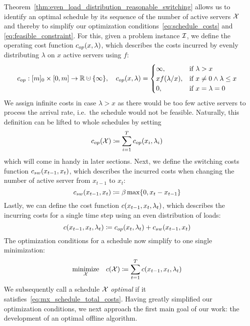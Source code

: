 Theorem~\ref{thm:even_load_distribution_reasonable_switching} allows us to identify an optimal schedule by its sequence of the number of active servers $\mathcal{X}$ and thereby to simplify our optimization conditions~\eqref{eq:schedule_costs} and \eqref{eq:feasible_constraint}. 
For this, given a problem instance $\mathcal{I}$, we define the operating cost function $c_{op}(x,\lambda)$, which describes the costs incurred by evenly distributing $\lambda$ on $x$ active servers using $f$:
\begin{equation}\label{eq:mx_schedule_op_costs}
	\opcosts:[m]_0\times[0,m]\rightarrow\mathbb{R}\dotcup\{\infty\},\quad \opcosts(x,\lambda)=\begin{cases}
	  \infty, & \text{if $\lambda>x$}\\
	  xf(\lambda/x), & \text{if $x\ne 0\land\lambda\le x$}\\
          0, & \text{if $x=\lambda=0$}
	  \end{cases}
\end{equation}
We assign infinite costs in case $\lambda>x$ as there would be too few active servers to process the arrival rate, i.e.\ the schedule would not be feasible. Naturally, this definition can be lifted to whole schedules by setting
\begin{equation}\label{eq:mx_schedule_op_costs_complete}
	c_{op}(\mathcal{X})\coloneqq\sum\limits_{i=1}^Tc_{op}(x_i,\lambda_i)
\end{equation}
which will come in handy in later sections. Next, we define the switching costs function $c_{sw}(x_{t-1},x_t)$, which describes the incurred costs when changing the number of active server from $x_{t-1}$ to $x_t$:
\begin{equation}\label{eq:mx_schedule_sw_costs}
	c_{sw}(x_{t-1},x_t)\coloneqq\beta\max\{0,x_t-x_{t-1}\}
\end{equation}
Lastly, we can define the cost function $c(x_{t-1},x_t,\lambda_t)$, which describes the incurring costs for a single time step using an even distribution of loads:
\begin{equation}\label{eq:mx_schedule_costs}
	c(x_{t-1},x_{t},\lambda_t)\coloneqq c_{op}(x_t,\lambda_t)+c_{sw}(x_{t-1},x_t)
\end{equation}
The optimization conditions for a schedule now simplify to one single minimization:
\begin{align}
	\underset{\mathcal{X}}{\text{minimize}}\quad c(\mathcal{X})\coloneqq\sum\limits_{t=1}^{T}c(x_{t-1},x_{t},\lambda_t)\label{eq:mx_schedule_total_costs}
\end{align}
We subsequently call a schedule $\mathcal{X}$ \emph{optimal} if it satisfies~\eqref{eq:mx_schedule_total_costs}. Having greatly simplified our optimization conditions, we next approach the first main goal of our work: the development of an optimal offline algorithm.
